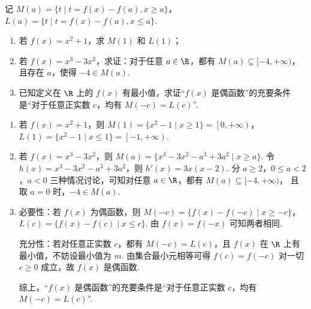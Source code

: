 \begin{problem}
记 \(M(a)=\{t\mid t=f(x)-f(a),x\ge a\}\)，\(L(a)=\{t\mid t=f(x)-f(a),x\le a\}\).

\begin{enumerate}
\item 若 \(f(x)=x^2+1\)，求 \(M(1)\) 和 \(L(1)\)；
\item 若 \(f(x)=x^3-3x^2\)，求证：对于任意 \(a\in\R\)，都有 \(M(a)\subseteq[-4,+\infty)\)，且存在 \(a\)，使得 \(-4\in M(a)\).
\item 已知定义在 \(\R\) 上的 \(f(x)\) 有最小值，求证“\(f(x)\) 是偶函数”的充要条件是“对于任意正实数 \(c\)，均有 \(M(-c)=L(c)\)”.
\end{enumerate}
\end{problem}

\begin{solution}
\begin{enumerate}
\item 若 \(f(x)=x^2+1\)，则 \(M(1)=\{x^2-1\mid x\ge 1\}=\left[0,+\infty\right)\)，\(L(1)=\{x^2-1\mid x\le 1\}=\left[-1,+\infty\right)\).

\item 若 \(f(x)=x^3-3x^2\)，则
\(M(a)=\{x^3-3x^2-a^3+3a^2\mid x\ge a\}\).
令 \(h(x)=x^3-3x^2-a^3+3a^2\)，则 \(h'(x)=3x(x-2)\). 分 \(a\ge 2\)，\(0\le a<2\)，\(a<0\) 三种情况讨论，可知对任意 \(a\in\R\)，都有
\(M(a)\subseteq[-4,+\infty)\)，
且取 \(a=0\) 时，\(-4\in M(a)\).

\item 必要性：若 \(f(x)\) 为偶函数，则 \(M(-c)=\{f(x)-f(-c)\mid x\ge -c\}\)，\(L(c)=\{f(x)-f(c)\mid x\le c\}\). 由 \(f(x)=f(-x)\) 可知两者相同.

充分性：若对任意正实数 \(c\)，都有 \(M(-c)=L(c)\)，且 \(f(x)\) 在 \(\R\) 上有最小值，不妨设最小值为 \(m\). 由集合最小元相等可得 \(f(c)=f(-c)\) 对一切 \(c\ge 0\) 成立，故 \(f(x)\) 是偶函数.

综上，“\(f(x)\) 是偶函数”的充要条件是“对于任意正实数 \(c\)，均有 \(M(-c)=L(c)\)”.
\end{enumerate}
\end{solution}
